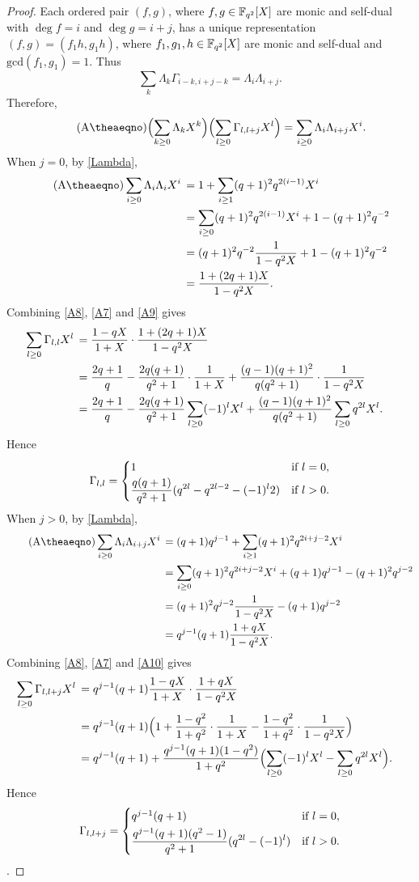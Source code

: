 \documentclass{amsart}
\numberwithin{equation}{section}
\theoremstyle{definition}
\newcommand{\f}{\Bbb F}
\begin{document}
\begin{proof}
Each ordered pair $(f,g)$, where $f,g\in\f_{q^2}[X]$ are monic and self-dual with $\deg f=i$ and $\deg g=i+j$, has a unique representation $(f,g)=(f_1h,g_1h)$, where $f_1,g_1,h\in\f_{q^2}[X]$ are monic and self-dual and $\text{gcd}(f_1,g_1)=1$. Thus
\[
\sum_k\Lambda_k\Gamma_{i-k,i+j-k}=\Lambda_i\Lambda_{i+j}.
\]
Therefore,
\begin{equation}\tag{A\theaeqno}\label{A8}
\Bigl(\sum_{k\ge 0}\Lambda_kX^k\Bigr)\Bigl(\sum_{l\ge 0}\Gamma_{l,l+j}X^l\Bigr)=\sum_{i\ge 0}\Lambda_i\Lambda_{i+j}X^i.
\end{equation}
When $j=0$, by \eqref{Lambda},
\begin{align}\tag{A\theaeqno}\label{A9}
\sum_{i\ge 0}\Lambda_i\Lambda_iX^i\,&=1+\sum_{i\ge 1}(q+1)^2q^{2(i-1)}X^i\\
&=\sum_{i\ge 0}(q+1)^2q^{2(i-1)}X^i+1-(q+1)^2q^{-2}\cr
&=(q+1)^2q^{-2}\frac 1{1-q^2X}+1-(q+1)^2q^{-2}\cr
&=\frac{1+(2q+1)X}{1-q^2X}.\nonumber
\end{align}
Combining \eqref{A8}, \eqref{A7} and \eqref{A9} gives
\begin{align*}
\sum_{l\ge 0}\Gamma_{l,l}X^l\,&=\frac{1-qX}{1+X}\cdot\frac{1+(2q+1)X}{1-q^2X}\cr
&=\frac{2q+1}q-\frac{2q(q+1)}{q^2+1}\cdot\frac 1{1+X}+\frac{(q-1)(q+1)^2}{q(q^2+1)}\cdot\frac 1{1-q^2X}\cr
&=\frac{2q+1}q-\frac{2q(q+1)}{q^2+1}\sum_{l\ge 0}(-1)^lX^l+\frac{(q-1)(q+1)^2}{q(q^2+1)}\sum_{l\ge 0}q^{2l}X^l.
\end{align*}
Hence
\[
\Gamma_{l,l}=\begin{cases}
1&\text{if}\ l=0,\vspace{0.2em}\cr
\displaystyle\frac{q(q+1)}{q^2+1}(q^{2l}-q^{2l-2}-(-1)^l2)&\text{if}\ l>0.
\end{cases}
\]
When $j>0$, by \eqref{Lambda},
\begin{align}\tag{A\theaeqno}\label{A10}
\sum_{i\ge 0}\Lambda_i\Lambda_{i+j}X^i\,&=(q+1)q^{j-1}+\sum_{i\ge 1}(q+1)^2q^{2i+j-2}X^i\\
&=\sum_{i\ge 0}(q+1)^2q^{2i+j-2}X^i+(q+1)q^{j-1}-(q+1)^2q^{j-2}\cr
&=(q+1)^2q^{j-2}\frac 1{1-q^2X}-(q+1)q^{j-2}\cr
&=q^{j-1}(q+1)\frac{1+qX}{1-q^2X}.\nonumber
\end{align}
Combining \eqref{A8}, \eqref{A7} and \eqref{A10} gives
\begin{align*}
\sum_{l\ge 0}\Gamma_{l,l+j}X^l\,&=q^{j-1}(q+1)\frac{1-qX}{1+X}\cdot\frac{1+qX}{1-q^2X}\cr
&=q^{j-1}(q+1)\Bigl(1+\frac{1-q^2}{1+q^2}\cdot\frac 1{1+X}-\frac{1-q^2}{1+q^2}\cdot\frac1{1-q^2X}\Bigr)\cr
&=q^{j-1}(q+1)+\frac{q^{j-1}(q+1)(1-q^2)}{1+q^2}\Bigl(\sum_{l\ge 0}(-1)^lX^l-\sum_{l\ge 0}q^{2l}X^l\Bigr).
\end{align*}
Hence
\[
\Gamma_{l,l+j}=\begin{cases}
q^{j-1}(q+1)&\text{if}\ l=0,\vspace{0.3em}\cr
\displaystyle\frac{q^{j-1}(q+1)(q^2-1)}{q^2+1}(q^{2l}-(-1)^l)&\text{if}\ l>0.
\end{cases}
\].
\end{proof}
\end{document}
